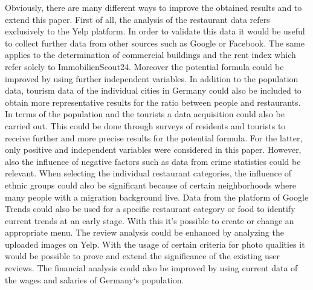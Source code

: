 Obviously, there are many different ways to improve the obtained results and to extend this paper. First of all, the analysis of the restaurant data refers exclusively to the Yelp platform. In order to validate this data it would be useful to collect further data from other sources such as Google or Facebook. The same applies to the determination of commercial buildings and the rent index which refer solely to ImmobilienScout24. \newline
Moreover the potential formula could be improved by using further independent variables. In addition to the population data, tourism data of the individual cities in Germany could also be included to obtain more representative results for the ratio between people and restaurants. In terms of the population and the tourists a data acquisition could also be carried out. This could be done through surveys of residents and tourists to receive further and more precise results for the potential formula. For the latter, only positive and independent variables were considered in this paper. However, also the influence of negative factors such as data from crime statistics could be relevant. \newline
When selecting the individual restaurant categories, the influence of ethnic groups could also be significant because of certain neighborhoods where many people with a migration background live. Data from the platform of Google Trends could also be used for a specific restaurant category or food to identify current trends at an early stage. With this it's possible to create or change an appropriate menu. \newline
The review analysis could be enhanced by analyzing the uploaded images on Yelp. With the usage of certain criteria for photo qualities it would be possible to prove and extend the significance of the existing user reviews. The financial analysis could also be improved by using current data of the wages and salaries of Germany‘s population.





